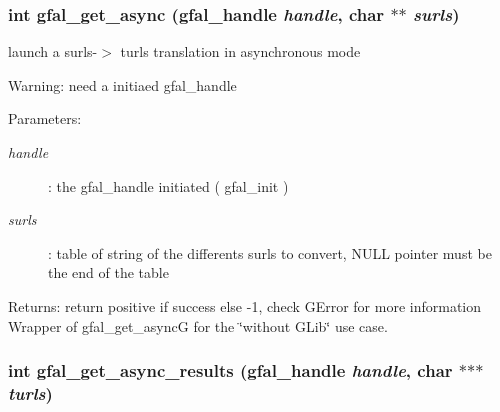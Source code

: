 \subsubsection{\setlength{\rightskip}{0pt plus 5cm}int gfal\_\-get\_\-async (gfal\_\-handle {\em handle}, char $\ast$$\ast$ {\em surls})}\label{gfal__common__interface_8c_68ef05f37b4971c8306b1cc6ee529647}


launch a surls-$>$ turls translation in asynchronous mode 

\begin{Desc}
\item[Warning:]need a initiaed gfal\_\-handle \end{Desc}
\begin{Desc}
\item[Parameters:]
\begin{description}
\item[{\em handle}]: the gfal\_\-handle initiated ( gfal\_\-init ) \item[{\em surls}]: table of string of the differents surls to convert, NULL pointer must be the end of the table \end{description}
\end{Desc}
\begin{Desc}
\item[Returns:]return positive if success else -1, check GError for more information Wrapper of gfal\_\-get\_\-async\-G for the \char`\"{}without GLib\char`\"{} use case. \end{Desc}
\subsubsection{\setlength{\rightskip}{0pt plus 5cm}int gfal\_\-get\_\-async\_\-results (gfal\_\-handle {\em handle}, char $\ast$$\ast$$\ast$ {\em turls})}\label{gfal__common__interface_8c_0c654545b837b8e1928842ee762ce5e9}


